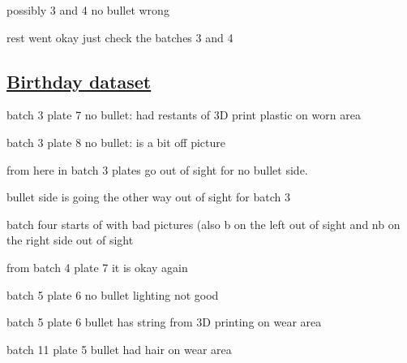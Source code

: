 \documentclass{scrartcl}
\begin{document}
possibly 3 and 4 no bullet wrong 

rest went okay just check the batches 3 and 4



\subsection{\href{../1_Birthday_dataset.tex}{Birthday dataset}}

batch 3 plate 7 no bullet:  had restants of 3D print plastic on worn area

batch 3 plate 8 no bullet:  is a bit off picture

from here in batch 3 plates go out of sight for no bullet side. 



bullet side is going the other way out of sight for batch 3 

batch four starts of with bad pictures (also b on the left out of sight and nb on the right side out of sight



from batch 4 plate 7 it is okay again



batch 5 plate 6 no bullet lighting not good

batch 5 plate 6 bullet has string from 3D printing on wear area



batch 11 plate 5 bullet had hair on wear area
\end{document}
